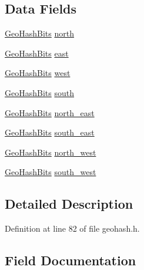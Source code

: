 \subsection*{Data Fields}
\begin{DoxyCompactItemize}
\item 
\hyperlink{struct_geo_hash_bits}{Geo\+Hash\+Bits} \hyperlink{struct_geo_hash_neighbors_ab3987f87ddeaec65ee9d85e1aa2b17c1}{north}
\item 
\hyperlink{struct_geo_hash_bits}{Geo\+Hash\+Bits} \hyperlink{struct_geo_hash_neighbors_a294392f413a5a059186ad92e0c810bc6}{east}
\item 
\hyperlink{struct_geo_hash_bits}{Geo\+Hash\+Bits} \hyperlink{struct_geo_hash_neighbors_a978b3a96b71db2c564f99aa5246cbb68}{west}
\item 
\hyperlink{struct_geo_hash_bits}{Geo\+Hash\+Bits} \hyperlink{struct_geo_hash_neighbors_a295756ba624169a6836bfe8fad69c592}{south}
\item 
\hyperlink{struct_geo_hash_bits}{Geo\+Hash\+Bits} \hyperlink{struct_geo_hash_neighbors_afeec2c92a9761e906ec87add9cd79c53}{north\+\_\+east}
\item 
\hyperlink{struct_geo_hash_bits}{Geo\+Hash\+Bits} \hyperlink{struct_geo_hash_neighbors_aa7aeb35d5a8f971e791be557068f140d}{south\+\_\+east}
\item 
\hyperlink{struct_geo_hash_bits}{Geo\+Hash\+Bits} \hyperlink{struct_geo_hash_neighbors_a9f9cd9ee352daae139aed5fa9f8a91a7}{north\+\_\+west}
\item 
\hyperlink{struct_geo_hash_bits}{Geo\+Hash\+Bits} \hyperlink{struct_geo_hash_neighbors_ab9b9fcb9d8039a5198d21cafdb6529a5}{south\+\_\+west}
\end{DoxyCompactItemize}


\subsection{Detailed Description}


Definition at line 82 of file geohash.\+h.



\subsection{Field Documentation}
\mbox{\label{struct_geo_hash_neighbors_a294392f413a5a059186ad92e0c810bc6}} 
